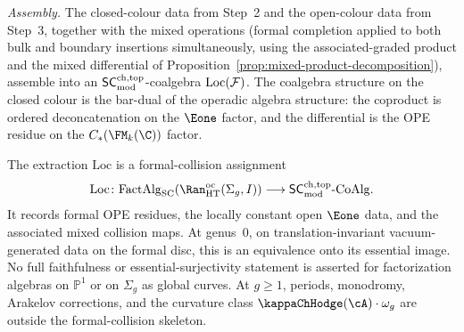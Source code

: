 \begin{construction}
\medskip\noindent
\emph{Assembly.} The closed-colour data from Step~2 and
the open-colour data from Step~3, together with the mixed
operations (formal completion applied to both bulk and
boundary insertions simultaneously, using the associated-graded
product and the mixed differential of
Proposition~\ref{prop:mixed-product-decomposition}),
assemble into an $\mathsf{SC}^{\mathrm{ch,top}}_{\mathrm{mod}}$-coalgebra $\mathrm{Loc}(\mathcal{F})$.
The coalgebra structure on the closed colour is the bar-dual
of the operadic algebra structure: the coproduct is
ordered deconcatenation on the $\Eone$ factor, and the
differential is the OPE residue on the
$C_\ast(\FM_k(\C))$ factor.
\end{construction}

\begin{proposition}
\label{prop:extraction-functor}
The extraction $\mathrm{Loc}$ is a formal-collision assignment
\[
 \mathrm{Loc} \colon
 \mathrm{FactAlg}_{\mathrm{SC}}(\Ran^{\mathrm{oc}}_{\mathrm{HT}}(\Sigma_g,I))
 \longrightarrow {\SCmod}\text{-}\mathrm{CoAlg}.
\]
It records formal OPE residues, the locally constant open
$\Eone$ data, and the associated mixed collision maps. At
genus~$0$, on translation-invariant vacuum-generated data on the
formal disc, this is an equivalence onto its essential image. No
full faithfulness or essential-surjectivity statement is asserted
for factorization algebras on $\mathbb{P}^1$ or on
$\Sigma_g$ as global curves. At $g\ge 1$, periods, monodromy,
Arakelov corrections, and the curvature class
$\kappaChHodge(\cA)\cdot\omega_g$ are outside the formal-collision
skeleton.
\end{proposition}

